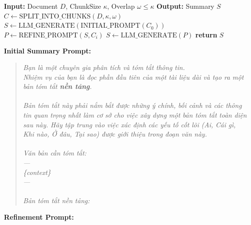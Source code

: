 \documentclass[11pt]{article}
\begin{document}
 
\begin{algorithm}
\caption{Iterative-Refinement Summarisation}
\label{alg:iterative}
\begin{algorithmic}[1]
\State \textbf{Input:} Document $D$, ChunkSize $\kappa$, Overlap $\omega \le \kappa$
\State \textbf{Output:} Summary $S$
\State $C \gets \text{SPLIT\_INTO\_CHUNKS}(D, \kappa, \omega)$ 
\State $S \gets \text{LLM\_GENERATE}(\text{INITIAL\_PROMPT}(C_0))$ 
    \State $P \gets \text{REFINE\_PROMPT}(S, C_i)$ 
    \State $S \gets \text{LLM\_GENERATE}(P)$
\EndFor
\State \textbf{return} $S$
\end{algorithmic}
\end{algorithm}

\textbf{Initial Summary Prompt:}

\begin{quote}
\textit{Bạn là một chuyên gia phân tích và tóm tắt thông tin.\\
Nhiệm vụ của bạn là đọc phần đầu tiên của một tài liệu dài và tạo ra một bản tóm tắt \textbf{nền tảng}.\\
\\
Bản tóm tắt này phải nắm bắt được những ý chính, bối cảnh và các thông tin quan trọng nhất làm cơ sở cho việc xây dựng một bản tóm tắt toàn diện sau này. Hãy tập trung vào việc xác định các yếu tố cốt lõi (Ai, Cái gì, Khi nào, Ở đâu, Tại sao) được giới thiệu trong đoạn văn này.\\
\\
Văn bản cần tóm tắt:\\
---\\
\{context\}\\
---\\
\\
Bản tóm tắt nền tảng:}
\end{quote}

\textbf{Refinement Prompt:}
\end{document}
